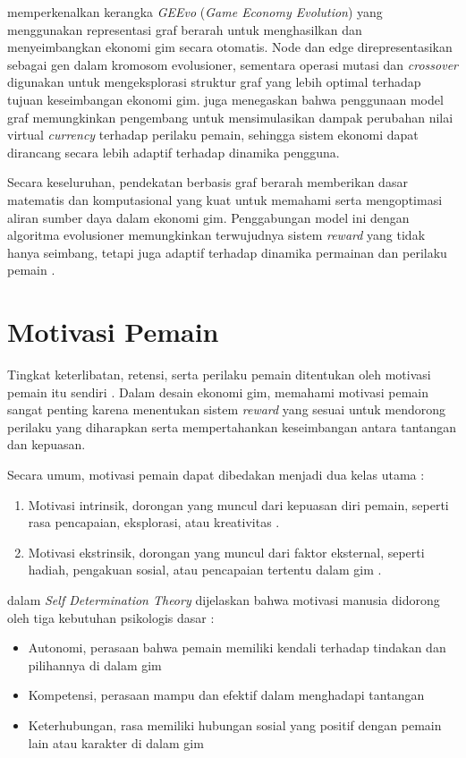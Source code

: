 \citet{Rupp_2024} memperkenalkan kerangka \textit{GEEvo} (\textit{Game Economy Evolution}) yang menggunakan representasi graf berarah untuk menghasilkan dan menyeimbangkan ekonomi gim secara otomatis. Node dan edge direpresentasikan sebagai gen dalam kromosom evolusioner, sementara operasi mutasi dan \textit{crossover} digunakan untuk mengeksplorasi struktur graf yang lebih optimal terhadap tujuan keseimbangan ekonomi gim. \citet{Lin2025} juga menegaskan bahwa penggunaan model graf memungkinkan pengembang untuk mensimulasikan dampak perubahan nilai virtual \textit{currency} terhadap perilaku pemain, sehingga sistem ekonomi dapat dirancang secara lebih adaptif terhadap dinamika pengguna.

Secara keseluruhan, pendekatan berbasis graf berarah memberikan dasar matematis dan komputasional yang kuat untuk memahami serta mengoptimasi aliran sumber daya dalam ekonomi gim. Penggabungan model ini dengan algoritma evolusioner memungkinkan terwujudnya sistem \textit{reward} yang tidak hanya seimbang, tetapi juga adaptif terhadap dinamika permainan dan perilaku pemain  \citep{Rogers2023}.


\section{Motivasi Pemain}
Tingkat keterlibatan, retensi, serta perilaku pemain ditentukan oleh motivasi pemain itu sendiri \citep{Bruhlmann2020}. Dalam desain ekonomi gim, memahami motivasi pemain sangat penting karena menentukan sistem \textit{reward} yang sesuai untuk mendorong perilaku yang diharapkan serta mempertahankan keseimbangan antara tantangan dan kepuasan. 

Secara umum, motivasi pemain dapat dibedakan menjadi dua kelas utama :
\begin{enumerate}
    \item Motivasi intrinsik, dorongan yang muncul dari kepuasan diri pemain, seperti rasa pencapaian, eksplorasi, atau kreativitas \citep{HoegVanDerKaapDeeder2023}.
    \item Motivasi ekstrinsik, dorongan yang muncul dari faktor eksternal, seperti hadiah, pengakuan sosial, atau pencapaian tertentu dalam gim \citep{HoegVanDerKaapDeeder2023}.
\end{enumerate}

dalam \textit{Self Determination Theory} dijelaskan bahwa motivasi manusia didorong oleh tiga kebutuhan psikologis dasar \citep{UysalYildirim2016} :

\begin{itemize}
    \item Autonomi, perasaan bahwa pemain memiliki kendali terhadap tindakan dan pilihannya di dalam gim
    \item Kompetensi, perasaan mampu dan efektif dalam menghadapi tantangan
    \item Keterhubungan, rasa memiliki hubungan sosial yang positif dengan pemain lain atau karakter di dalam gim
\end{itemize}

